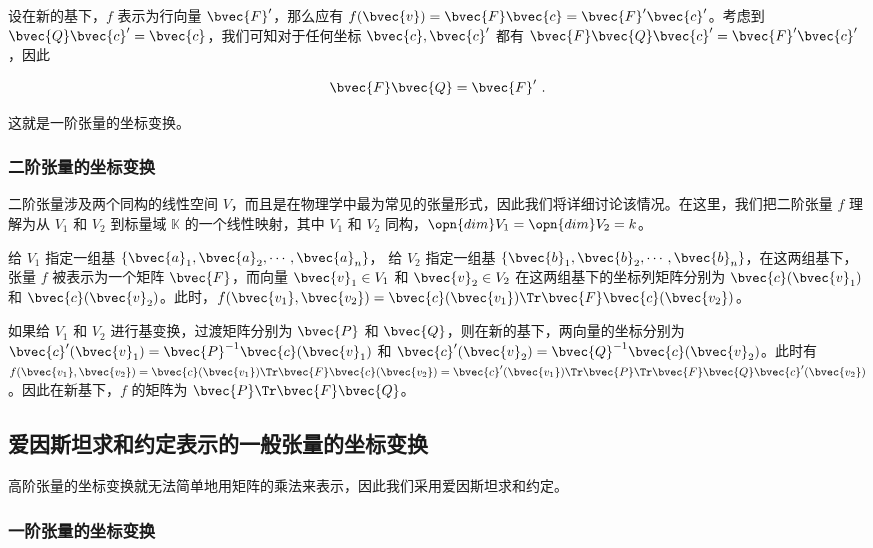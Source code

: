 设在新的基下，$f$ 表示为行向量 $\bvec{F}'$，那么应有 $f(\bvec{v})=\bvec{F}\bvec{c}=\bvec{F}'\bvec{c}'$。考虑到 $\bvec{Q}\bvec{c}'=\bvec{c}$，我们可知对于任何坐标 $\bvec{c}, \bvec{c}'$ 都有 $\bvec{F}\bvec{Q}\bvec{c}'=\bvec{F}'\bvec{c}'$，因此

\begin{equation}
\bvec{F}\bvec{Q}=\bvec{F}'~.
\end{equation}

这就是一阶张量的坐标变换。
\subsubsection{二阶张量的坐标变换}

二阶张量涉及两个同构的线性空间 $V$，而且是在物理学中最为常见的张量形式，因此我们将详细讨论该情况。在这里，我们把二阶张量 $f$ 理解为从 $V_1$ 和 $V_2$ 到标量域 $\mathbb{K}$ 的一个线性映射，其中 $V_1$ 和 $V_2$ 同构，$\opn{dim}V_1=\opn{dim}V_2=k$。

给 $V_1$ 指定一组基 $\{\bvec{a}_1, \bvec{a}_2, \cdots, \bvec{a}_n\}$， 给 $V_2$ 指定一组基 $\{\bvec{b}_1, \bvec{b}_2, \cdots, \bvec{b}_n\}$，在这两组基下，张量 $f$ 被表示为一个矩阵 $\bvec{F}$，而向量 $\bvec{v}_1\in V_1$ 和 $\bvec{v}_2\in V_2$ 在这两组基下的坐标列矩阵分别为 $\bvec{c}(\bvec{v}_1)$ 和 $\bvec{c}(\bvec{v}_2)$。此时，$f(\bvec{v_1},\bvec{v_2})=\bvec{c}(\bvec{v_1})\Tr\bvec{F}\bvec{c}(\bvec{v_2})$。

如果给 $V_1$ 和 $V_2$ 进行基变换，过渡矩阵分别为 $\bvec{P}$ 和 $\bvec{Q}$，则在新的基下，两向量的坐标分别为 $\bvec{c}'(\bvec{v}_1)=\bvec{P}^{-1}\bvec{c}(\bvec{v}_1)$ 和 $\bvec{c}'(\bvec{v}_2)=\bvec{Q}^{-1}\bvec{c}(\bvec{v}_2)$。此时有 $f(\bvec{v_1},\bvec{v_2})=\bvec{c}(\bvec{v_1})\Tr\bvec{F}\bvec{c}(\bvec{v_2})=\bvec{c}'(\bvec{v_1})\Tr\bvec{P}\Tr\bvec{F}\bvec{Q}\bvec{c}'(\bvec{v_2})$。因此在新基下，$f$ 的矩阵为 $\bvec{P}\Tr\bvec{F}\bvec{Q}$。



\subsection{爱因斯坦求和约定表示的一般张量的坐标变换}

高阶张量的坐标变换就无法简单地用矩阵的乘法来表示，因此我们采用爱因斯坦求和约定。

\subsubsection{一阶张量的坐标变换}

